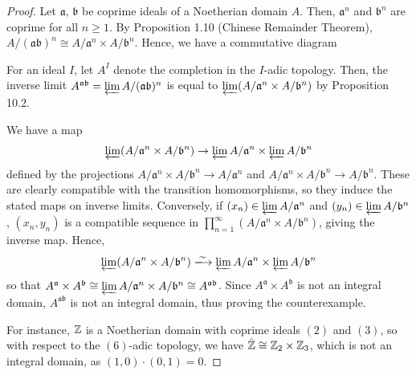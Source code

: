 \begin{proof}
Let $\mathfrak{a}$, $\mathfrak{b}$ be coprime ideals of a Noetherian domain $A$. Then, $\mathfrak{a}^n$ and $\mathfrak{b}^n$ are coprime for all $n \ge 1$. 
By Proposition 1.10 (Chinese Remainder Theorem), $A/(\mathfrak{ab})^n \cong A/\mathfrak{a}^n \times A/\mathfrak{b}^n$. Hence, we have a
commutative diagram
\begin{center}
\end{center}
For an ideal $I$, let $A^I$ denote the completion in the $I$-adic topology. Then, the inverse limit $A^{\mathfrak{a}\mathfrak{b}} = \varprojlim A/(\mathfrak{a}\mathfrak{b})^n$
is equal to $\varprojlim (A/\mathfrak{a}^n \times A/\mathfrak{b}^n)$ by Proposition 10.2. 

We have a map
$$\varprojlim (A/\mathfrak{a}^n \times A/\mathfrak{b}^n) \to \varprojlim A/\mathfrak{a}^n \times \varprojlim A/\mathfrak{b}^n$$
defined by the projections $A/\mathfrak{a}^n \times A/\mathfrak{b}^n \to A/\mathfrak{a}^n$ and $A/\mathfrak{a}^n \times A/\mathfrak{b}^n \to A/\mathfrak{b}^n$.
These are clearly compatible with the transition homomorphisms, so they induce the stated maps on inverse limits. Conversely, if $(x_n) \in \varprojlim A/\mathfrak{a}^n$
and $(y_n) \in \varprojlim A/\mathfrak{b}^n$, $(x_n,y_n)$ is a compatible sequence in $\prod_{n=1}^{\infty} (A/\mathfrak{a}^n \times A/\mathfrak{b}^n)$, giving 
the inverse map. Hence,
$$\varprojlim (A/\mathfrak{a}^n \times A/\mathfrak{b}^n) \xlongrightarrow{\sim} \varprojlim A/\mathfrak{a}^n \times \varprojlim A/\mathfrak{b}^n$$
so that $A^{\mathfrak{a}} \times A^{\mathfrak{b}} \cong \varprojlim A/\mathfrak{a}^n \times A/\mathfrak{b}^n \cong A^{\mathfrak{a}\mathfrak{b}}$.
Since $A^{\mathfrak{a}} \times A^{\mathfrak{b}}$ is not an integral domain, $A^{\mathfrak{a}\mathfrak{b}}$ is not an integral domain, thus
proving the counterexample.

For instance, $\mathbb{Z}$ is a Noetherian domain with coprime ideals $(2)$ and $(3)$, so with respect to the $(6)$-adic topology, we have $\hat {\mathbb{Z}} \cong \mathbb{Z}_2 \times \mathbb{Z}_3$,
which is not an integral domain, as $(1,0) \cdot (0,1) = 0$.
\end{proof}

